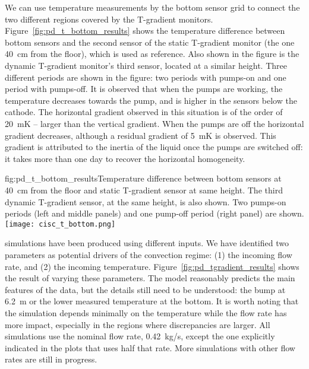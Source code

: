 We can use temperature measurements by the bottom sensor grid to connect the two different 
regions covered by the T-gradient monitors. Figure~\ref{fig:pd_t_bottom_results} shows the temperature difference between bottom sensors and the second sensor of the static T-gradient monitor (the one \SI{40}{cm} from the floor), which is used as reference. %
Also shown in the figure is the  dynamic T-gradient monitor's third sensor, located at a similar height. Three different periods are shown in the figure: two periods with pumps-on and one period with pumps-off. It is observed that when the pumps are working, the temperature decreases towards the  pump, and is %
higher in the sensors below the cathode. The horizontal gradient observed in this situation is of the order of \SI{20}{mK} -- larger than the vertical gradient. When the pumps are off the horizontal gradient decreases, although a residual gradient of  \SI{5}{mK}  is observed. This gradient is attributed to the inertia of the liquid once the pumps are switched off: it takes more than one day to recover the horizontal homogeneity.    

\begin{dunefigure}{fig:pd_t_bottom_results}{Temperature difference between bottom sensors at  \SI{40}{cm} from the floor and static T-gradient sensor at same height. The third dynamic T-gradient sensor, at the same height, is also shown. Two pumps-on periods (left and middle panels) and one pump-off period (right panel) are shown.}
  \texttt{[image: cisc\_t\_bottom.png]}%
\end{dunefigure}

 simulations have been produced using different inputs. We have identified two  parameters %
as potential drivers of the convection regime: (1) the incoming  flow rate, and (2) the incoming  temperature. Figure~\ref{fig:pd_tgradient_results} shows the result of varying these parameters. 
The  model reasonably predicts the main features of the data, but the details still need to be understood: the bump at \SI{6.2}{m} or  the lower measured temperature at the bottom. It is worth noting that the simulation depends minimally on the  temperature while the flow rate has more impact, especially in the regions where discrepancies are larger. All simulations use the nominal  flow rate, \SI{0.42}{kg/s}, except the one explicitly indicated 
in the plots that uses half that rate. More simulations with other  flow rates %
are still in progress.

